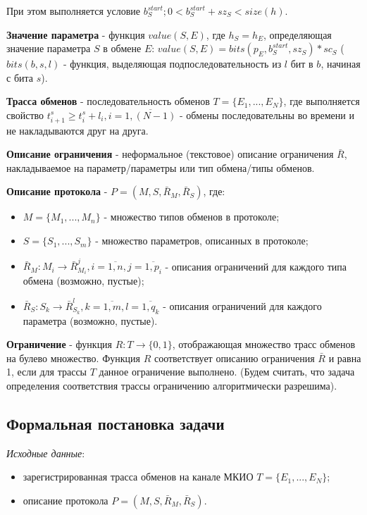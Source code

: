 При этом выполняется условие $b^{start}_S; 0 < b^{start}_S + sz_S < size(h)$.

\textbf{Значение параметра} - функция $value(S, E)$, где $h_S = h_E$, 
определяющая значение параметра $S$ в обмене $E$: $value(S, E) = bits(p_E, 
b^{start}_S, sz_S) * sc_S$ ($bits(b, s, l)$ - функция, выделяющая 
подпоследовательность из $l$ бит в $b$, начиная с бита $s$).

\textbf{Трасса обменов} - последовательность обменов $T = \{E_1, ..., E_N\}$, 
где выполняется свойство $t^s_{i+1} \geq t^s_{i} + l_{i}, i = 
\overline{1,(N-1)}$ - обмены последовательны во времени и не накладываются друг 
на друга.


\textbf{Описание ограничения} - неформальное (текстовое) описание ограничения 
$\bar{R}$, накладываемое на параметр/параметры или тип обмена/типы обменов.

\textbf{Описание протокола} - $P = (M, S, \bar{R}_M, \bar{R}_S)$, где:
 \begin{itemize}
  \item $M = \{M_1, ..., M_n\}$ - множество типов обменов в протоколе;
  \item $S = \{S_1, ..., S_m\}$ - множество параметров, описанных в протоколе;
  \item $\bar{R}_M: M_i \rightarrow \bar{R}_{M_i}^{j}, i = \overline{1,n}, j = 
\overline{1,p_i}$ - описания ограничений для каждого типа
обмена (возможно, пустые);
  \item $\bar{R}_S: S_k \rightarrow \bar{R}_{S_k}^{l}, k = \overline{1,m}, l = 
\overline{1, 
q_k}$ - описания ограничений для каждого параметра (возможно, пустые).
\end{itemize}

\textbf{Ограничение} - функция $R: T \rightarrow \{0, 1\}$, отображающая 
множество трасс обменов на булево множество. Функция $R$ соответствует описанию 
ограничения $\bar{R}$ и равна 1, если для трассы $T$ данное ограничение 
выполнено. (Будем считать, что задача определения соответствия трассы 
ограничению алгоритмически разрешима).
 
 
\subsection{Формальная постановка задачи}

\textit{Исходные данные}: 

\begin{itemize}
 \item зарегистрированная трасса обменов на канале МКИО $T = \{E_1, ..., E_N\}$;
 \item описание протокола $P = (M, S, \bar{R}_M, \bar{R}_S)$.
\end{itemize}

